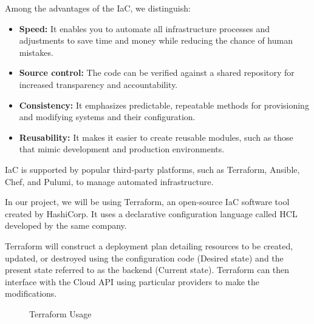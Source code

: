 Among the advantages of the IaC, we distinguish:

\begin{itemize}[label=\textbullet] 

\item \textbf{Speed:} It enables you to automate all infrastructure processes and adjustments to save time and money while reducing the chance of human mistakes.

\item \textbf{Source control:} The code can be verified against a shared repository for increased transparency and accountability.

\item \textbf{Consistency:} It emphasizes predictable, repeatable methods for provisioning and modifying systems and their configuration.

\item \textbf{Reusability:} It makes it easier to create reusable modules, such as those that mimic development and production environments.
\end{itemize}

IaC is supported by popular third-party platforms, such as Terraform, Ansible, Chef, and Pulumi, to manage automated infrastructure. 

In our project, we will be using Terraform, an open-source IaC software tool created by HashiCorp. It uses a declarative configuration language called HCL developed by the same company. 

Terraform will construct a deployment plan detailing resources to be created, updated, or destroyed using the configuration code (Desired state) and the present state referred to as the backend (Current state). Terraform can then interface with the Cloud API using particular providers to make the modifications.

    \begin{figure}[!h]
    \centering
    \caption{Terraform Usage}
    \label{fig:control-tower}
    \cite{multi-account-aws}
    
    \end{figure}
    

